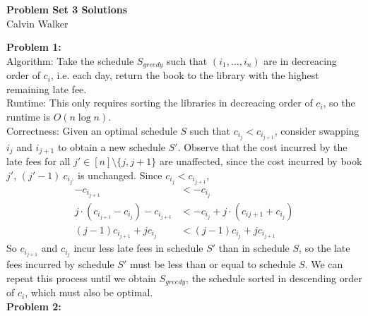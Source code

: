 \documentclass{article}
\begin{document}
\begin{center}
    \Large{\textbf{Problem Set 3 Solutions}} \\[0.25ex]
    Calvin Walker
\end{center}
\textbf{Problem 1:} \\[1.0ex]
Algorithm: Take the schedule $S_{greedy}$ such that $(i_1, \dots, i_n)$ are in decreacing order of $c_i$, i.e. each day, return the book to the library with the highest remaining late fee. \\[0.5ex]
Runtime: This only requires sorting the libraries in decreacing order of $c_i$, so the runtime is $O(n \log n)$. \\[0.5ex]
Correctness: Given an optimal schedule $S$ such that $c_{i_j} < c_{i_{j + 1}}$, consider swapping $i_j$ and $i_{j + 1}$ to obtain a new schedule $S'$. Observe that the cost incurred by the late fees for all $j' \in [n] \setminus \{j, j + 1\}$ are unaffected, since the cost incurred by book $j'$, $(j' - 1)\ c_{i_{j'}}$ is unchanged.
Since $c_{i_j} < c_{i_{j + 1}}$,
\begin{align}
    - c_{i_{j + 1}} &< - c_{i_j} \\
    j \cdot (c_{i_{j + 1}} - c_{i_j}) - c_{i_{j + 1}} &< - c_{i_j} + j \cdot (c_{i{j + 1}} + c_{i_j}) \\
    (j - 1) c_{i_{j + 1}} + j c_{i_j} &<  (j - 1) c_{i_{j}} + j c_{i_{j + 1}}
\end{align}
So $c_{i_{j + 1}}$ and $c_{i_{j}}$  incur less late fees in schedule $S'$ than in schedule $S$, so the late fees incurred by schedule $S'$ must be less than or equal to schedule $S$. We can repeat this process until we obtain $S_{greedy}$, the schedule sorted in descending order of $c_{i}$, which must also be optimal. \\[1.0ex]
\textbf{Problem 2:} 
\end{document}
